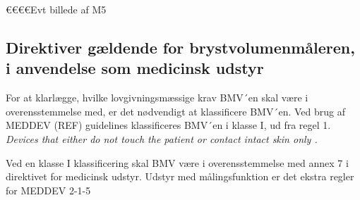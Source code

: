 €€€€Evt billede af M5

\subsection{Direktiver gældende for brystvolumenmåleren, i anvendelse som medicinsk udstyr}
For at klarlægge, hvilke lovgivningsmæssige krav BMV´en skal være i overensstemmelse med, er det nødvendigt at klassificere BMV´en. Ved brug af MEDDEV (REF) guidelines klassificeres BMV´en i klasse I, ud fra regel 1.  
\textit{Devices that either do not touch the patient or contact intact skin only .} 

Ved en klasse I klassificering skal BMV være i overensstemmelse med annex 7 i direktivet for medicinsk udstyr.
Udstyr med målingsfunktion er det ekstra regler for MEDDEV 2-1-5